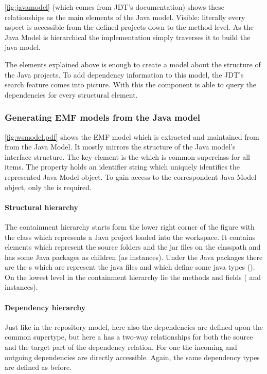 \autoref{fig:javamodel} (which comes from JDT's documentation) shows these
relationships as the main elements of the Java model. Visible: literally every aspect 
is accessible from the defined projects down to the method level. As the Java Model 
is hierarchical the implementation simply traverses it to build the java model. 

The elements explained above is enough to create a model about the structure of
the Java projects. To add dependency information to this model, the JDT's search
feature comes into picture. With this the component is able to query the dependencies
for every structural element. 

\subsubsection{Generating EMF models from the Java model}
\autoref{fig:wsmodel.pdf} shows the EMF model which is extracted and maintained
from from the Java Model. It mostly mirrors the structure of the Java model's
interface structure. The key element is the  which is common
superclass for all items. The  property holds an identifier string
which uniquely identifies the represented Java Model object. To gain access to
the correspondent Java Model object, only the  is
required.

\paragraph{Structural hierarchy}
The containment hierarchy starts form the lower right corner of the figure with
the  class which represents a Java project loaded into the
workspace. It contains  elements which represent the
source folders and the jar files on the classpath and has some Java packages as
children (as  instances). Under the Java packages there
are the s which are represent the java files and which
define some java types (). On the lowest level in the containment
hierarchy lie the methods and fields ( and 
instances).

\paragraph{Dependency hierarchy}
Just like in the repository model, here also the dependencies are defined upon
the common supertype, but here a  has a two-way relationships
for both the source and the target part of the dependency relation. For one
 the incoming and outgoing dependencies are directly
accessible. Again, the same dependency types are defined as before.

